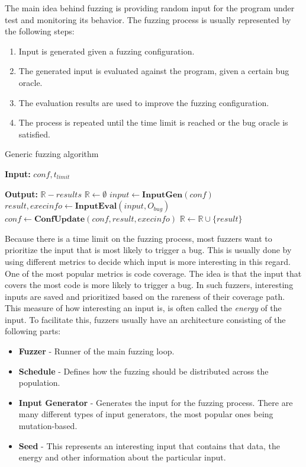 The main idea behind fuzzing is providing random input for the program under test and monitoring its behavior.
The fuzzing process is usually represented by the following steps:
\begin{enumerate}
    \item Input is generated given a fuzzing configuration.
    \item The generated input is evaluated against the program, given a certain bug oracle.
    \item The evaluation results are used to improve the fuzzing configuration.
    \item The process is repeated until the time limit is reached or the bug oracle is satisfied.
\end{enumerate}

\begin{algorithm}
    \caption{Generic fuzzing algorithm}\label{alg:fuzz}
    \begin{algorithmic}
        \item \textbf{Input: } $conf, t_{limit}$
        \item \textbf{Output: } $\mathbb{R} - results$
        \State $\mathbb{R} \gets \emptyset$
        \State $input \gets \textbf{InputGen}(conf)$
        \State $result, execinfo \gets \textbf{InputEval}(input, O_{bug})$
        \State $conf \gets \textbf{ConfUpdate}(conf, result, execinfo)$
        \State $\mathbb{R} \gets \mathbb{R} \cup \{result\}$
        \EndWhile
    \end{algorithmic}
\end{algorithm}

Because there is a time limit on the fuzzing process, most fuzzers want to prioritize the input that is most likely to trigger a bug.
This is usually done by using different metrics to decide which input is more interesting in this regard.
One of the most popular metrics is code coverage.
The idea is that the input that covers the most code is more likely to trigger a bug.
In such fuzzers, interesting inputs are saved and prioritized based on the rareness of their coverage path.
This measure of how interesting an input is, is often called the \textit{energy} of the input.
To facilitate this, fuzzers usually have an architecture consisting of the following parts:
\begin{itemize}
    \item \textbf{Fuzzer} - Runner of the main fuzzing loop.
    \item \textbf{Schedule} - Defines how the fuzzing should be distributed across the population.
    \item \textbf{Input Generator} - Generates the input for the fuzzing process. There are many different types of input generators, the most popular ones being mutation-based.
    \item \textbf{Seed} - This represents an interesting input that contains that data, the energy and other information about the particular input.
\end{itemize}

